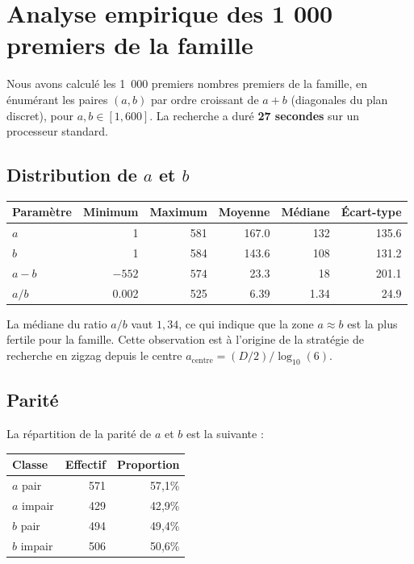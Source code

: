\documentclass[12pt,a4paper]{article}
\theoremstyle{definition}
\begin{document}
\section{Analyse empirique des 1 000 premiers de la famille}

Nous avons calculé les 1~000 premiers nombres premiers de la famille,
en énumérant les paires $(a,b)$ par ordre croissant de $a+b$
(diagonales du plan discret), pour $a, b \in [1, 600]$.
La recherche a duré \textbf{27 secondes} sur un processeur standard.

\subsection{Distribution de $a$ et $b$}

\begin{center}
\renewcommand{\arraystretch}{1.2}
\begin{tabular}{lrrrrr}
  \toprule
  Paramètre & Minimum & Maximum & Moyenne & Médiane & Écart-type \\
  \midrule
  $a$       & 1  & 581 & 167.0 & 132 & 135.6 \\
  $b$       & 1  & 584 & 143.6 & 108 & 131.2 \\
  $a - b$   & $-552$ & $574$ & 23.3 & 18 & 201.1 \\
  $a/b$     & 0.002 & 525 & 6.39 & 1.34 & 24.9 \\
  \bottomrule
\end{tabular}
\end{center}

La médiane du ratio $a/b$ vaut $1{,}34$, ce qui indique que la zone
$a \approx b$ est la plus fertile pour la famille.
Cette observation est à l'origine de la stratégie de recherche
en zigzag depuis le centre $a_{\text{centre}} = (D/2)/\log_{10}(6)$.

\subsection{Parité}

La répartition de la parité de $a$ et $b$ est la suivante :

\begin{center}
\begin{tabular}{lrr}
  \toprule
  Classe & Effectif & Proportion \\
  \midrule
  $a$ pair     & 571 & 57{,}1\% \\
  $a$ impair   & 429 & 42{,}9\% \\
  \midrule
  $b$ pair     & 494 & 49{,}4\% \\
  $b$ impair   & 506 & 50{,}6\% \\
  \bottomrule
\end{tabular}
\end{center}
\end{document}
